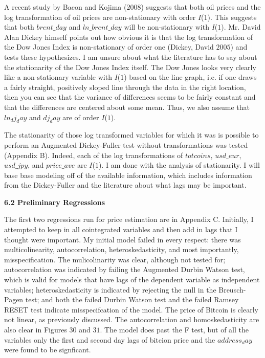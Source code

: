 \documentclass{article}[10 pt]
\newcommand{\vs}{\vspace{0.1in}}
\begin{document}
\vs

A recent study by Bacon and Kojima ($2008$) suggests that both oil prices
and the log transformation of oil prices are non-stationary with order
$I$($1$). This suggests that both $brent\_day$ and $ln\_brent\_day$ will be
non-stationary with $I$($1$). Mr. David Alan Dickey himself points out how
obvious it is that the log transformation of the Dow Jones Index is
non-stationary of order one (Dickey, David $2005$) and tests these
hypothesizes. I am unsure about what the literature has to say about the
stationarity of the Dow Jones Index itself. The Dow Jones looks very
clearly like a non-stationary variable with $I$($1$) based on the line
graph, i.e. if one draws a fairly straight, positively sloped line through
the data in the right location, then you can see that the variance of
differences seems to be fairly constant and that the differences are
centered about some mean. Thus, we also assume that $ln_dj_day$ and
$dj_day$ are of order $I$($1$). 

\vs

The stationarity of those log transformed variables for which it was is
possible to perform an Augmented Dickey-Fuller test without transformations
was tested (Appendix B). Indeed, each of the log transformations of
$totcoins$, $usd\_eur$, $usd\_jpy$, and $price\_ave$ are $I$($1$). I am
done with the analysis of stationarity. I will base base modeling off of
the available information, which includes information from the
Dickey-Fuller and the literature about what lags may be important.

\vs

\textbf{6.2 Preliminary Regressions}

\vs

The first two regressions run for price estimation are in Appendix C.
Initially, I attempted to keep in all cointegrated variables and then add
in lags that I thought were important. My initial model failed in every
respect: there was multicolinearity, autocorrelation, heteroskedasticity,
and most importantly, misspecification. The mulicolinarity was clear,
although not tested for; autocorrelation was indicated by failing the
Augmented Durbin Watson test, which is valid for models that have lags of
the dependent variable as independent variables; heteroskedasticity is
indicated by rejecting the null in the Breusch-Pagen test; and both the
failed Durbin Watson test and the failed Ramsey RESET test indicate
misspecifcation of the model. The price of Bitcoin is clearly not linear,
as previously discussed. The autocorrelation and homoskedasticity are also
clear in Figures $30$ and $31$. The model does past the F test, but of all
the variables only the first and second day lags of bitcion price and the
$address_day$ were found to be signficant. 
\end{document}
